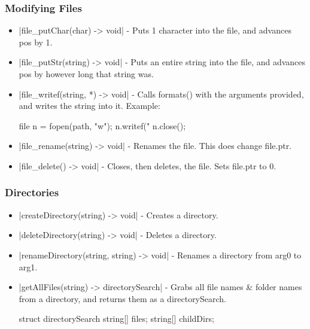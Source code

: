 \documentclass[12pt, letterpaper, oneside]{article}
\begin{document}
	\subsubsection{Modifying Files}
		\begin{itemize}
			\item[--] \spverb|file_putChar(char) -> void| - Puts 1 character into the file, and advances pos by 1.
			\item[--] \spverb|file_putStr(string) -> void| - Puts an entire string into the file, and advances pos by however long that string was.
			\item[--] \spverb|file_writef(string, *) -> void| - Calls formats() with the arguments provided, and writes the string into it. Example:
			
			\begin{spverbatim}
				file n = fopen(path, "w");
				n.writef("%
				n.close();
			\end{spverbatim}
			\newline
			\item[--] \spverb|file_rename(string) -> void| - Renames the file. This does change file.ptr.
			\item[--] \spverb|file_delete() -> void| - Closes, then deletes, the file. Sets file.ptr to 0.
		\end{itemize}
	\subsubsection{Directories}
		\begin{itemize}
			\item[--] \spverb|createDirectory(string) -> void| - Creates a directory.
			\item[--] \spverb|deleteDirectory(string) -> void| - Deletes a directory.
			\item[--] \spverb|renameDirectory(string, string) -> void| - Renames a directory from arg0 to arg1.
			\item[--] \spverb|getAllFiles(string) -> directorySearch| - Grabs all file names \& folder names from a directory, and returns them as a directorySearch.
			
			
			\begin{spverbatim}
				struct directorySearch {
					string[] files;
					string[] childDirs;
				}
			\end{spverbatim}
		\end{itemize}
	\newpage
	\label{sec:future}
\end{document}
